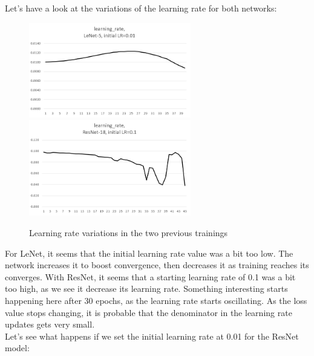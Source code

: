 \documentclass{article}
\begin{document}
  Let's have a look at the variations of the learning rate for both networks:
  
  \begin{figure}[!h]
	\includegraphics[width=200pt]{lr_lenet_0_01.png}
	\includegraphics[width=200pt]{lr_resnet_0_1.png}
	\caption{Learning rate variations in the two previous trainings}
\end{figure}
  
  For LeNet, it seems that the initial learning rate value was a bit too low. The network increases it to boost convergence, then decreases it as training reaches its converges. With ResNet, it seems that a starting learning rate of 0.1 was a bit too high, as we see it decrease its learning rate. Something interesting starts happening here after 30 epochs, as the learning rate starts oscillating. As the loss value stops changing, it is probable that the denominator in the learning rate updates gets very small.\\
  
  Let's see what happens if we set the initial learning rate at 0.01 for the ResNet model:\\
  
\end{document}
